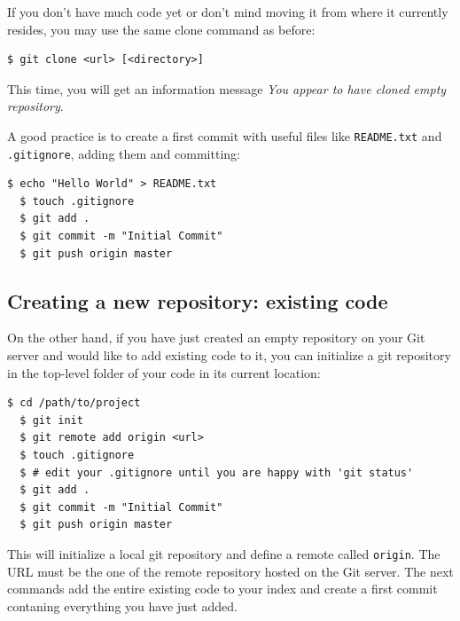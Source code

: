 \documentclass{../common/tufte-latex/tufte-handout}
\begin{document}
If you don't have much code yet or don't mind moving it from where it currently resides, you may use the same clone command as before:

\begin{lstlisting}[style=BashInputStyle]
  $ git clone <url> [<directory>]
\end{lstlisting}

This time, you will get an information message \textit{You appear to have cloned empty repository}.

A good practice is to create a first commit with useful files like \texttt{README.txt} and \texttt{.gitignore}, adding them and committing: 

\begin{lstlisting}[style=BashInputStyle]
  $ echo "Hello World" > README.txt
  $ touch .gitignore
  $ git add .
  $ git commit -m "Initial Commit"
  $ git push origin master
\end{lstlisting}

\subsection{Creating a new repository: existing code}

On the other hand, if you have just created an empty repository on your Git server and would like to add existing code to it, you can initialize a git repository in the top-level folder of your code in its current location: 

\begin{lstlisting}[style=BashInputStyle]
  $ cd /path/to/project
  $ git init
  $ git remote add origin <url>
  $ touch .gitignore
  $ # edit your .gitignore until you are happy with 'git status'
  $ git add .
  $ git commit -m "Initial Commit"
  $ git push origin master
\end{lstlisting} 

This will initialize a local git repository and define a remote called \texttt{origin}. The URL must be the one of the remote repository hosted on the Git server. The next commands add the entire existing code to your index and create a first commit contaning everything you have just added. 
\end{document}
